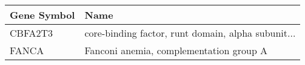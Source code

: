 \begin{tabular}{ll}
\toprule
Gene Symbol &                                               Name \\
\midrule
    CBFA2T3 & core-binding factor, runt domain, alpha subunit... \\
      FANCA &            Fanconi anemia, complementation group A \\
\bottomrule
\end{tabular}
